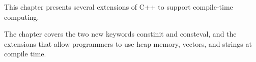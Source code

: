 This chapter presents several extensions of C++ to support compile-time computing.

The chapter covers the two new keywords constinit and consteval, and the extensions that allow programmers to use heap memory, vectors, and strings at compile time.